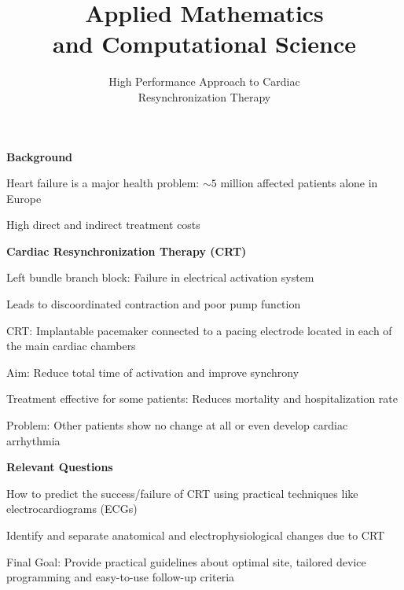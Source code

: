 \documentclass[12pt]{ICSPoster}
\title{Applied Mathematics\\[0.2cm]and Computational Science}
\subtitle{High Performance Approach to Cardiac\\ Resynchronization Therapy}
\begin{document}
  \maketitle

  \begin{posterbox}[2]
    \begin{headerbox}[
        title=Background: Understanding Cardiac Resynchronization Therapy,
        height=0.23\textheight,
        width=0.47\textwidth]
      \begin{minipage}{\textwidth}\sf
        \textbf{Background}
        \vspace{1mm}
        \begin{compactitem}
          \item Heart failure is a major health problem: $\sim 5$ million affected patients alone in Europe
          \item High direct and indirect treatment costs
        \end{compactitem}
      \end{minipage}

      \vspace{0.5cm}

      \begin{minipage}{0.55\textwidth}\sf
        \textbf{Cardiac Resynchronization Therapy (CRT)}
        \begin{compactitem}
          \item Left bundle branch block: Failure in electrical activation system
          \item Leads to discoordinated contraction and poor pump function
          \item CRT: Implantable pacemaker connected to a pacing electrode
                located in each of the main cardiac chambers
          \item Aim: Reduce total time of activation and improve synchrony
          \item Treatment effective for some patients: Reduces mortality and hospitalization rate
          \item Problem: Other patients show no change at all or even develop cardiac arrhythmia
        \end{compactitem}

        \vspace{0.5cm}

        \textbf{Relevant Questions}
        \begin{compactitem}
          \item How to predict the success/failure of CRT using practical techniques like electrocardiograms (ECGs)
          \item Identify and separate anatomical and electrophysiological changes due to CRT
          \item Final Goal: Provide practical guidelines about optimal site, tailored device programming
                and easy-to-use follow-up criteria
        \end{compactitem}


\end{minipage}
\end{headerbox}
\end{posterbox}
\end{document}
